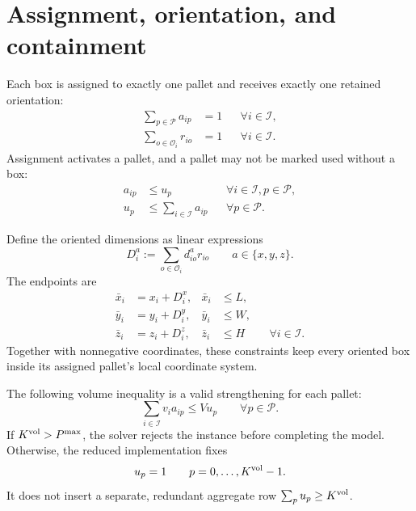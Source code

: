 \documentclass[11pt]{article}
\newcommand{\Items}{\mathcal I}
\newcommand{\Pallets}{\mathcal P}
\newcommand{\Orients}{\mathcal O}
\begin{document}
\section{Assignment, orientation, and containment}

Each box is assigned to exactly one pallet and receives exactly one retained
orientation:
\begin{align}
 \sum_{p\in\Pallets}a_{ip}&=1 &&\forall i\in\Items,\label{eq:assign-once}\\
 \sum_{o\in\Orients_i}r_{io}&=1 &&\forall i\in\Items.\label{eq:orient-once}
\end{align}
Assignment activates a pallet, and a pallet may not be marked used without a
box:
\begin{align}
 a_{ip}&\le u_p &&\forall i\in\Items,p\in\Pallets,\label{eq:activate}\\
 u_p&\le\sum_{i\in\Items}a_{ip} &&\forall p\in\Pallets.\label{eq:used-box}
\end{align}

Define the oriented dimensions as linear expressions
\begin{equation}
 D_i^a:=\sum_{o\in\Orients_i}d^a_{io}r_{io}
 \qquad a\in\{x,y,z\}.
 \label{eq:oriented-dimensions}
\end{equation}
The endpoints are
\begin{align}
 \bar x_i&=x_i+D_i^x,& \bar x_i&\le L,\label{eq:x-bound}\\
 \bar y_i&=y_i+D_i^y,& \bar y_i&\le W,\label{eq:y-bound}\\
 \bar z_i&=z_i+D_i^z,& \bar z_i&\le H
 &&\forall i\in\Items.\label{eq:z-bound}
\end{align}
Together with nonnegative coordinates, these constraints keep every oriented
box inside its assigned pallet's local coordinate system.

The following volume inequality is a valid strengthening for each pallet:
\begin{equation}
 \sum_{i\in\Items}v_i a_{ip}\le Vu_p
 \qquad\forall p\in\Pallets.
 \label{eq:volume-capacity}
\end{equation}
If $K^{\rm vol}>P^{\max}$, the solver rejects the instance before completing
the model.  Otherwise, the reduced implementation fixes
\begin{equation}
 u_p=1\qquad p=0,\ldots,K^{\rm vol}-1.
 \label{eq:fixed-volume-prefix}
\end{equation}
It does not insert a separate, redundant aggregate row
$\sum_pu_p\ge K^{\rm vol}$.
\end{document}
